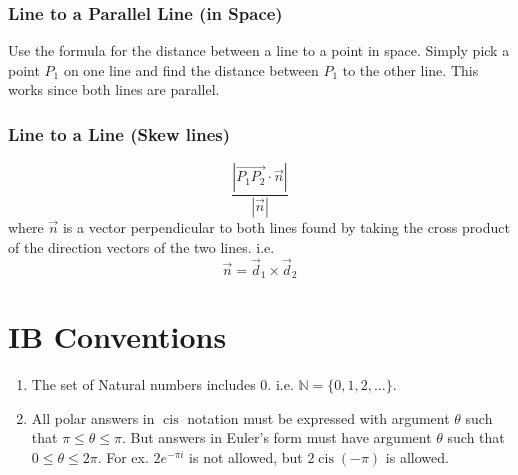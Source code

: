 \documentclass{report}
\DeclareMathOperator\cis{cis}
\theoremstyle{definition}
\numberwithin{equation}{section}
\begin{document}
\subsubsection{Line to a Parallel Line (in Space)}
Use the formula for the distance between a line to a point in space. Simply pick a point $P_1$ on one line and find the distance between $P_1$ to the other line. This works since both lines are parallel.

\subsubsection{Line to a Line (Skew lines)}
\begin{equation}
	\frac{|\overrightarrow{P_1P_2} \cdot \vec n|}{|\vec n|}
\end{equation}
where $\vec n$ is a vector perpendicular to both lines found by taking the cross product of the direction vectors of the two lines. i.e.
\begin{equation*}
	\vec n = \vec d_1 \times \vec d_2
\end{equation*}

\section{IB Conventions}
\begin{enumerate}
	\item The set of Natural numbers includes 0. i.e. $\mathbb{N} = \{0,1,2,\dots\}$.
	\item All polar answers in $\cis$ notation must be expressed with argument $\theta$ such that $\pi\le\theta\le\pi$. But answers in Euler's form must have argument $\theta$ such that $0 \le \theta \le 2 \pi$. For ex. $2e^{-\pi i}$ is not allowed, but $2\cis(-\pi)$ is allowed.
\end{enumerate}
\end{document}
